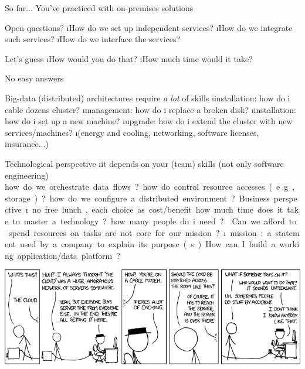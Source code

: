 \begin{frame}[allowframebreaks]{So far...}
You've practiced with on-premises solutions

Open questions?
\i How do we set up independent services?
\i How do we integrate such services?
\i How do we interface the services?

Let's guess
\i How would you do that?
\i How much time would it take?

\framebreak

No easy answers

Big-data (distributed) architectures require \textit{a lot} of skills
\i installation: how do i cable dozens cluster?
\i management: how do i replace a broken disk?
\i installation: how do i set up a new machine?
\i upgrade: how do i extend the cluster with new services/machines?
\i (energy and cooling, networking, software licenses, insurance...)

\framebreak

Technological perspective
\i it depends on your (team) skills (not only software engineering)
\si how do we orchestrate data flows?
\si how do control resource accesses (e.g., storage)?
\si how do we configure a distributed environment?

Business perspective
\i no free lunch, each choice as cost/benefit
\si how much time does it take to master a technology?
\si how many people do i need?

\framebreak

Can we afford to spend resources on tasks are not core for our mission?
\i mission: a statement used by a company to explain its purpose(s)

How can I build a working application/data platform?

\end{frame}



\begin{frame}
\includegraphics[width=\textwidth]{imgs/xkcd_cloud.png}
\end{frame}

